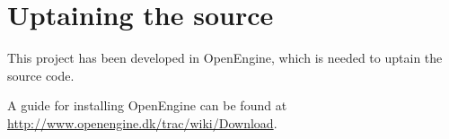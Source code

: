 \chapter{Uptaining the source}

This project has been developed in OpenEngine, which is needed to
uptain the source code.

A guide for installing OpenEngine can be found at
\url{http://www.openengine.dk/trac/wiki/Download}.

